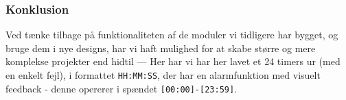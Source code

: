 {%
\subsubsection{Konklusion}
   Ved tænke tilbage på funktionaliteten af de moduler vi tidligere har bygget, og bruge dem i nye designs,  har vi haft mulighed for at skabe større og mere komplekse projekter end hidtil ---  Her har vi har her lavet et 24 timers ur (med en enkelt fejl), i formattet \texttt{HH:MM:SS}, der har en alarmfunktion med visuelt feedback - denne opererer i spændet \texttt{[00:00]-[23:59]}.
}